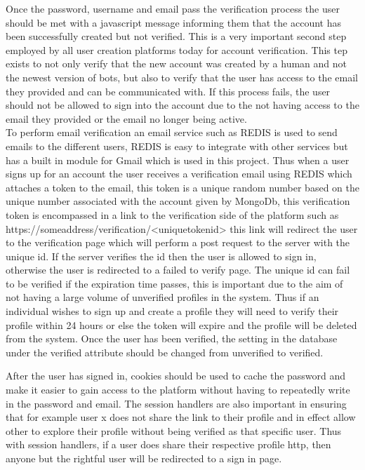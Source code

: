 \documentclass{article}
\begin{document}
Once the password, username and email pass the verification process the user should be met with a javascript message informing them that the account has been successfully created but not verified. This is a very important second step employed by all user creation platforms today for account verification. This tep exists to not only verify that the new account was created by a human and not the newest version of bots, but also to verify that the user has access to the email they provided and can be communicated with. If this process fails, the user should not be allowed to sign into the account due to the not having access to the email they provided or the email no longer being active.\\

To perform email verification an email service such as REDIS is used to send emails to the different users, REDIS is easy to integrate with other services but has a built in module for Gmail which is used in this project. Thus when a user signs up for an account the user receives a verification email using REDIS which attaches a token to the email, this token is a unique random number based on the unique number associated with the account given by MongoDb, this verification token is encompassed in a link to the verification side of the platform such as https://someaddress/verification/<uniquetokenid> this link will redirect the user to the verification page which will perform a post request to the server with the unique id. If the server verifies the id then the user is allowed to sign in, otherwise the user is redirected to a failed to verify page. The unique id can fail to be verified if the expiration time passes, this is important due to the aim of not having a large volume of unverified profiles in the system. Thus if an individual wishes to sign up and create a profile they will need to verify their profile within 24 hours or else the token will expire and the profile will be deleted from the system. Once the user has been verified, the setting in the database under the verified attribute should be changed from unverified to verified.

After the user has signed in, cookies should be used to cache the password and make it easier to gain access to the platform without having to repeatedly write in the password and email. The session handlers are also important in ensuring that for example user x does not share the link to their profile and in effect allow other to explore their profile without being verified as that specific user. Thus with session handlers, if a user does share their respective  profile http, then anyone but the rightful user will be redirected to a sign in page. 
\end{document}
